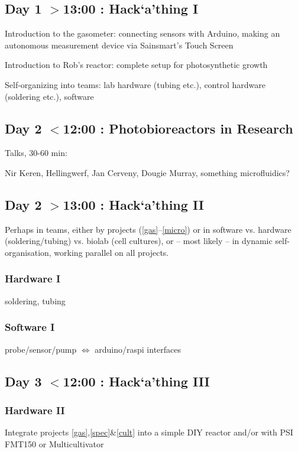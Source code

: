 \documentclass[12pt,a4paper]{article}
\begin{document}
\subsection{Day 1 $>$13:00 : Hack`a'thing I}

Introduction to the gasometer: connecting sensors with Arduino,
making an autonomous measurement device via Sainsmart's Touch Screen

Introduction to Rob's reactor: complete setup for photosynthetic growth

Self-organizing into teams: lab hardware (tubing etc.), control hardware
(soldering etc.), software

\subsection{Day 2 $<$12:00 : Photobioreactors in Research}

Talks, 30-60 min:

Nir Keren, Hellingwerf, Jan Cerveny, Dougie Murray,
something microfluidics?

\subsection{Day 2 $>$13:00 : Hack`a'thing II}

Perhaps in teams, either by projects (\ref{gas}--\ref{micro}) or in
software vs. hardware (soldering/tubing) vs. biolab (cell cultures),
or -- most likely -- in dynamic self-organisation, working parallel on
all projects.

\subsubsection{Hardware I} 
soldering, tubing

\subsubsection{Software I} 
probe/sensor/pump $\Leftrightarrow$ arduino/raspi interfaces

\subsection{Day 3 $<$12:00 : Hack`a'thing III}

\subsubsection{Hardware II} 
Integrate projects \ref{gas},\ref{spec}\&\ref{cult} into a simple DIY
reactor and/or with PSI FMT150 or Multicultivator
\end{document}
